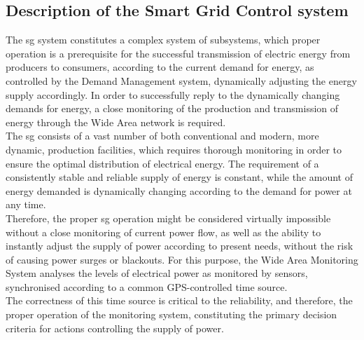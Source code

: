 \subsection{Description of the Smart Grid  Control system}
The \acrlong{sg} system constitutes a complex system of subsystems, which proper operation is a prerequisite for the successful transmission of electric energy from producers to consumers, according to the current demand for energy, as controlled by the Demand Management system, dynamically adjusting the energy supply accordingly. In order to successfully reply to the dynamically changing demands for energy, a close monitoring of the production and transmission of energy through the Wide Area network is required. \\ 

The \acrshort{sg} consists of a vast number of both conventional and modern, more dynamic, production facilities, which requires thorough monitoring in order to ensure the optimal distribution of electrical energy. The requirement of a consistently stable and reliable supply of energy is constant, while the amount of energy demanded is dynamically changing according to the demand for power at any time. \\ 

Therefore, the proper \acrshort{sg} operation might be considered virtually impossible without a  close monitoring of current power flow, as well as the ability to instantly adjust the supply of power according to present needs,  without the risk of causing power surges or blackouts. For this purpose, the Wide Area Monitoring System analyses the levels of electrical power as monitored by sensors, synchronised according to a common GPS-controlled time source. \\ 

The correctness of this time source is critical to the reliability, and therefore, the proper operation of the monitoring system, constituting the primary decision criteria for actions controlling the supply of power.






\
 






